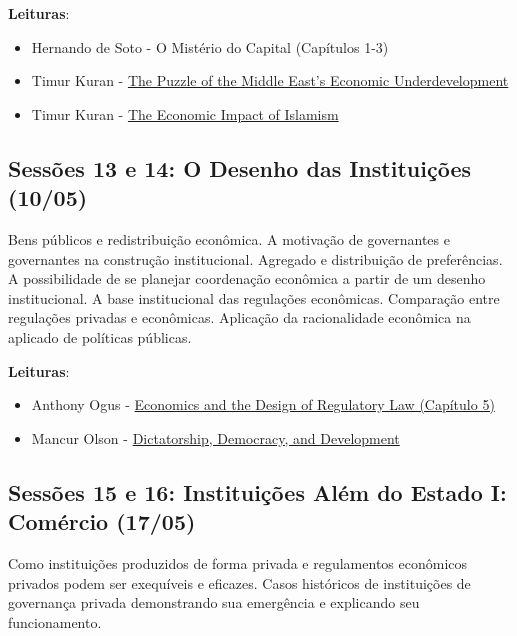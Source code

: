 \documentclass[12pt,]{article}
\providecommand{\tightlist}{%
  \setlength{\itemsep}{0pt}\setlength{\parskip}{0pt}}
\begin{document}
\textbf{Leituras}:

\begin{itemize}
\tightlist
\item
  Hernando de Soto - O Mistério do Capital (Capítulos 1-3)
\item
  Timur Kuran -
  \href{https://github.com/danilofreire/eei-omma-ufm/blob/master/sessoes-11-12/kuran-01.pdf}{The
  Puzzle of the Middle East's Economic Underdevelopment}
\item
  Timur Kuran -
  \href{https://github.com/danilofreire/eei-omma-ufm/blob/master/sessoes-11-12/kuran-02.pdf}{The
  Economic Impact of Islamism}
\end{itemize}

\subsection{Sessões 13 e 14: O Desenho das Instituições
(10/05)}\label{sessoes-13-e-14-o-desenho-das-instituicoes-1005}

Bens públicos e redistribuição econômica. A motivação de governantes e
governantes na construção institucional. Agregado e distribuição de
preferências. A possibilidade de se planejar coordenação econômica a
partir de um desenho institucional. A base institucional das regulações
econômicas. Comparação entre regulações privadas e econômicas. Aplicação
da racionalidade econômica na aplicado de políticas públicas.

\textbf{Leituras}:

\begin{itemize}
\tightlist
\item
  Anthony Ogus -
  \href{https://github.com/danilofreire/eei-omma-ufm/blob/master/sessoes-13-14/ogus.pdf}{Economics
  and the Design of Regulatory Law (Capítulo 5)}
\item
  Mancur Olson -
  \href{https://github.com/danilofreire/eei-omma-ufm/blob/master/sessoes-13-14/olson.pdf}{Dictatorship,
  Democracy, and Development}
\end{itemize}

\subsection{Sessões 15 e 16: Instituições Além do Estado I: Comércio
(17/05)}\label{sessoes-15-e-16-instituicoes-alem-do-estado-i-comercio-1705}

Como instituições produzidos de forma privada e regulamentos econômicos
privados podem ser exequíveis e eficazes. Casos históricos de
instituições de governança privada demonstrando sua emergência e
explicando seu funcionamento.
\end{document}
